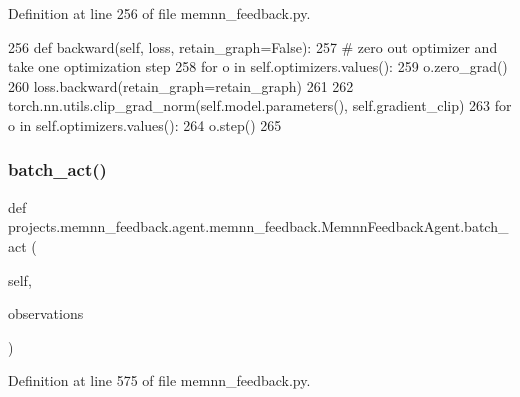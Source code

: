 Definition at line 256 of file memnn\+\_\+feedback.\+py.


\begin{DoxyCode}
256     \textcolor{keyword}{def }backward(self, loss, retain\_graph=False):
257         \textcolor{comment}{# zero out optimizer and take one optimization step}
258         \textcolor{keywordflow}{for} o \textcolor{keywordflow}{in} self.optimizers.values():
259             o.zero\_grad()
260         loss.backward(retain\_graph=retain\_graph)
261 
262         torch.nn.utils.clip\_grad\_norm(self.model.parameters(), self.gradient\_clip)
263         \textcolor{keywordflow}{for} o \textcolor{keywordflow}{in} self.optimizers.values():
264             o.step()
265 
\end{DoxyCode}
\mbox{\label{classprojects_1_1memnn__feedback_1_1agent_1_1memnn__feedback_1_1MemnnFeedbackAgent_af47447adf3b049849603021a9aa03fef}} 
\subsubsection{\texorpdfstring{batch\+\_\+act()}{batch\_act()}}
{\footnotesize\ttfamily def projects.\+memnn\+\_\+feedback.\+agent.\+memnn\+\_\+feedback.\+Memnn\+Feedback\+Agent.\+batch\+\_\+act (\begin{DoxyParamCaption}\item[{}]{self,  }\item[{}]{observations }\end{DoxyParamCaption})}



Definition at line 575 of file memnn\+\_\+feedback.\+py.


